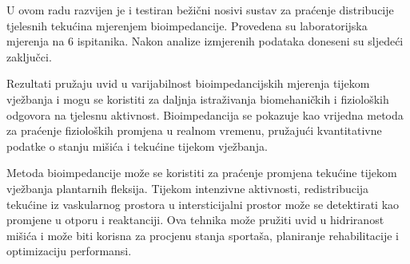 \documentclass[../diplomski_rad.tex]{subfiles}
\begin{document}
\sloppy

\justifying

U ovom radu razvijen je i testiran bežični nosivi sustav za praćenje distribucije tjelesnih tekućina 
mjerenjem bioimpedancije. Provedena su laboratorijska mjerenja na 6 ispitanika. 
Nakon analize izmjerenih podataka doneseni su sljedeći zaključci.

Rezultati pružaju uvid u varijabilnost bioimpedancijskih mjerenja tijekom vježbanja i mogu se 
koristiti za daljnja istraživanja biomehaničkih i fizioloških odgovora na tjelesnu aktivnost. 
Bioimpedancija se pokazuje kao vrijedna metoda za praćenje fizioloških promjena u realnom vremenu, 
pružajući kvantitativne podatke o stanju mišića i tekućine tijekom vježbanja.

Metoda bioimpedancije može se koristiti za praćenje promjena tekućine tijekom vježbanja plantarnih fleksija. 
Tijekom intenzivne aktivnosti, redistribucija tekućine iz vaskularnog prostora u intersticijalni prostor 
može se detektirati kao promjene u otporu i reaktanciji. 
Ova tehnika može pružiti uvid u hidriranost mišića i može biti korisna za procjenu stanja sportaša, 
planiranje rehabilitacije i optimizaciju performansi.
\end{document}
